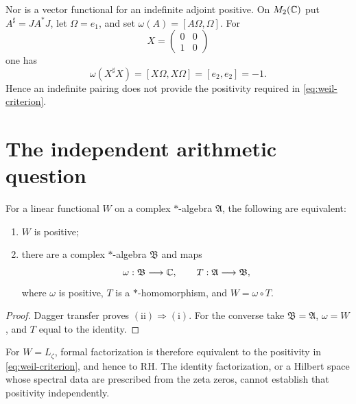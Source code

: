 Nor is a vector functional for an indefinite adjoint positive.  On
$M_2(\mathbb C)$ put $A^\sharp=JA^*J$, let $\Omega=e_1$, and set
$\omega(A)=[A\Omega,\Omega]$.  For
\[
 X=\begin{pmatrix}0&0\\1&0\end{pmatrix}
\]
one has
\begin{equation}
 \omega(X^\sharp X)=[X\Omega,X\Omega]=[e_2,e_2]=-1.
 \label{eq:indefinite-negative}
\end{equation}
Hence an indefinite pairing does not provide the positivity required in
\eqref{eq:weil-criterion}.

\section{The independent arithmetic question}

\begin{proposition}
For a linear functional $W$ on a complex $*$-algebra $\mathfrak A$, the
following are equivalent:
\begin{enumerate}
\item $W$ is positive;
\item there are a complex $*$-algebra $\mathfrak B$ and maps
\[
 \omega:\mathfrak B\longrightarrow\mathbb C,
 \qquad T:\mathfrak A\longrightarrow\mathfrak B,
\]
where $\omega$ is positive, $T$ is a $*$-homomorphism, and
$W=\omega\circ T$.
\end{enumerate}
\end{proposition}

\begin{proof}
Dagger transfer proves $(\mathrm{ii})\Rightarrow(\mathrm{i})$.  For the converse take
$\mathfrak B=\mathfrak A$, $\omega=W$, and $T$ equal to the identity.
\end{proof}

For $W=L_\zeta$, formal factorization is therefore equivalent to the
positivity in \eqref{eq:weil-criterion}, and hence to RH.  The identity
factorization, or a Hilbert space whose spectral data are prescribed from
the zeta zeros, cannot establish that positivity independently.

